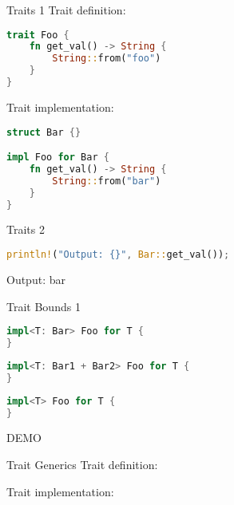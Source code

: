 
\begin{frame}[fragile,t]{Traits 1}
    Trait definition:
    \begin{lstlisting}[language=Rust,escapechar=@,label={lst:traits1}]
trait Foo {
    fn get_val() -> String {
        String::from("foo")
    }
}\end{lstlisting}

    \pause
    Trait implementation:
    \begin{lstlisting}[language=Rust,escapechar=@,label={lst:traits2}]
struct Bar {}

impl Foo for Bar {
    fn get_val() -> String {
        String::from("bar")
    }
}\end{lstlisting}

\end{frame}

\begin{frame}[fragile,t]{Traits 2}
    \begin{lstlisting}[language=Rust,escapechar=@,label={lst:traits3}]
println!("Output: {}", Bar::get_val());
\end{lstlisting}

    \pause
    \begin{codeoutput}
        Output: bar
    \end{codeoutput}
\end{frame}

\begin{frame}[fragile,t]{Trait Bounds 1}
    \begin{lstlisting}[language=Rust,escapechar=@,label={lst:traitbounds1}]
impl<T: Bar> Foo for T {
}\end{lstlisting}

    \pause
    \begin{lstlisting}[language=Rust,escapechar=@,label={lst:traitbounds2}]
impl<T: Bar1 + Bar2> Foo for T {
}\end{lstlisting}

    \pause
    \begin{lstlisting}[language=Rust,escapechar=@,label={lst:traitbounds3}]
impl<T> Foo for T {
}\end{lstlisting}

    \pause DEMO
\end{frame}

\begin{frame}[fragile,t]{Trait Generics}
    Trait definition:

    \pause
    Trait implementation:
\end{frame}

